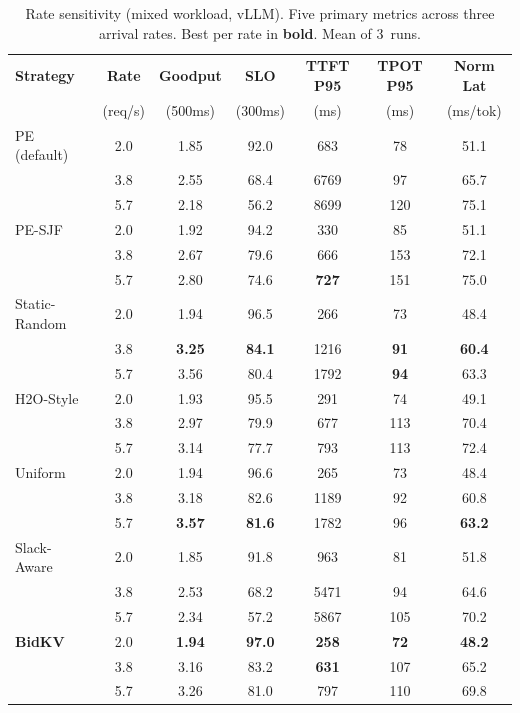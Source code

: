 \begin{table}[t]
\centering
\caption{Rate sensitivity (mixed workload, vLLM).  Five primary metrics across
  three arrival rates.  Best per rate in \textbf{bold}.  Mean of 3~runs.}
\label{tab:rate_full}
\footnotesize
\begin{tabular}{@{}l c c c c c c@{}}
\toprule
\textbf{Strategy} & \textbf{Rate} & \textbf{Goodput} & \textbf{SLO}
  & \textbf{TTFT P95} & \textbf{TPOT P95} & \textbf{Norm Lat} \\
  & (req/s) & (500ms) & (300ms) & (ms) & (ms) & (ms/tok) \\
\midrule
PE (default)             & 2.0 & 1.85 & 92.0 & 683 & 78 & 51.1 \\
                         & 3.8 & 2.55 & 68.4 & 6769 & 97 & 65.7 \\
                         & 5.7 & 2.18 & 56.2 & 8699 & 120 & 75.1 \\
\midrule
PE-SJF                   & 2.0 & 1.92 & 94.2 & 330 & 85 & 51.1 \\
                         & 3.8 & 2.67 & 79.6 & 666 & 153 & 72.1 \\
                         & 5.7 & 2.80 & 74.6 & \textbf{727} & 151 & 75.0 \\
\midrule
Static-Random            & 2.0 & 1.94 & 96.5 & 266 & 73 & 48.4 \\
                         & 3.8 & \textbf{3.25} & \textbf{84.1} & 1216 & \textbf{91} & \textbf{60.4} \\
                         & 5.7 & 3.56 & 80.4 & 1792 & \textbf{94} & 63.3 \\
\midrule
H2O-Style                & 2.0 & 1.93 & 95.5 & 291 & 74 & 49.1 \\
                         & 3.8 & 2.97 & 79.9 & 677 & 113 & 70.4 \\
                         & 5.7 & 3.14 & 77.7 & 793 & 113 & 72.4 \\
\midrule
Uniform                  & 2.0 & 1.94 & 96.6 & 265 & 73 & 48.4 \\
                         & 3.8 & 3.18 & 82.6 & 1189 & 92 & 60.8 \\
                         & 5.7 & \textbf{3.57} & \textbf{81.6} & 1782 & 96 & \textbf{63.2} \\
\midrule
Slack-Aware              & 2.0 & 1.85 & 91.8 & 963 & 81 & 51.8 \\
                         & 3.8 & 2.53 & 68.2 & 5471 & 94 & 64.6 \\
                         & 5.7 & 2.34 & 57.2 & 5867 & 105 & 70.2 \\
\midrule
\textbf{BidKV}           & 2.0 & \textbf{1.94} & \textbf{97.0} & \textbf{258} & \textbf{72} & \textbf{48.2} \\
                         & 3.8 & 3.16 & 83.2 & \textbf{631} & 107 & 65.2 \\
                         & 5.7 & 3.26 & 81.0 & 797 & 110 & 69.8 \\
\bottomrule
\end{tabular}
\end{table}